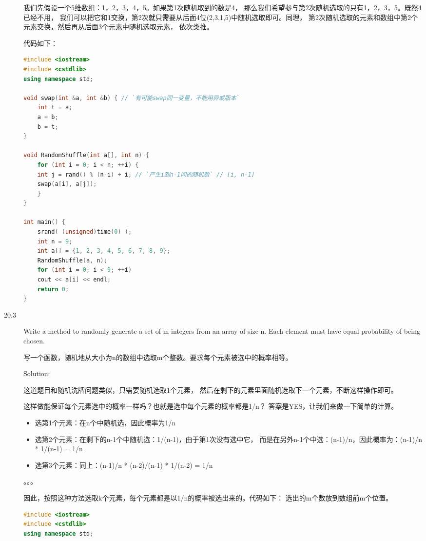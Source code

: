 \begin{description}
我们先假设一个5维数组：1，2，3，4，5。如果第1次随机取到的数是4， 那么我们希望参与第2次随机选取的只有1，2，3，5。既然4已经不用， 我们可以把它和1交换，第2次就只需要从后面4位(2,3,1,5)中随机选取即可。同理， 第2次随机选取的元素和数组中第2个元素交换，然后再从后面3个元素中随机选取元素， 依次类推。

代码如下：
\begin{lstlisting}[language=C++]
#include <iostream>
#include <cstdlib>
using namespace std;

void swap(int &a, int &b) { // `有可能swap同一变量，不能用异或版本`
    int t = a;
    a = b;
    b = t;
}

void RandomShuffle(int a[], int n) {
    for (int i = 0; i < n; ++i) {
	int j = rand() % (n-i) + i; // `产生i到n-1间的随机数` // [i, n-1]
	swap(a[i], a[j]);
    }
}

int main() {
    srand( (unsigned)time(0) );
    int n = 9;
    int a[] = {1, 2, 3, 4, 5, 6, 7, 8, 9};
    RandomShuffle(a, n);
    for (int i = 0; i < 9; ++i)
	cout << a[i] << endl;
    return 0;
}
\end{lstlisting}
%


\item[20.3] Write a method to randomly generate a set of m integers from an array of size n. Each element must have equal probability of being chosen.

写一个函数，随机地从大小为n的数组中选取m个整数。要求每个元素被选中的概率相等。

Solution:

这道题目和随机洗牌问题类似，只需要随机选取1个元素， 然后在剩下的元素里面随机选取下一个元素，不断这样操作即可。

这样做能保证每个元素选中的概率一样吗？也就是选中每个元素的概率都是1/n？ 答案是YES，让我们来做一下简单的计算。
\begin{itemize}
\item 选第1个元素：在n个中随机选，因此概率为1/n
\item 选第2个元素：在剩下的n-1个中随机选：1/(n-1)，由于第1次没有选中它， 而是在另外n-1个中选：(n-1)/n，因此概率为：(n-1)/n * 1/(n-1) = 1/n
\item 选第3个元素：同上：(n-1)/n * (n-2)/(n-1) * 1/(n-2) = 1/n
\end{itemize}
。。。

因此，按照这种方法选取k个元素，每个元素都是以1/n的概率被选出来的。代码如下： 选出的m个数放到数组前m个位置。
\begin{lstlisting}[language=C++]
#include <iostream>
#include <cstdlib>
using namespace std;


\end{lstlisting}
\end{description}
